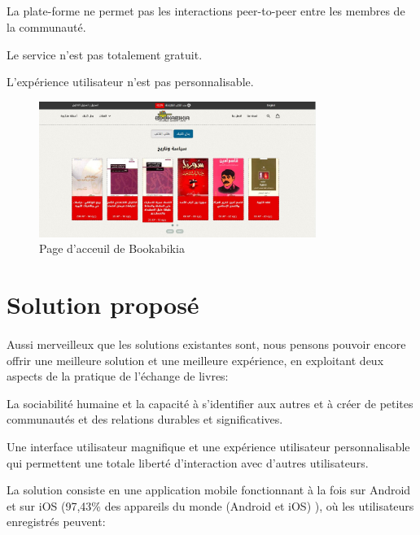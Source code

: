 \subparagraph*{}
\begin{list}{•}{\textbf{Inconvénients}}
	\item La plate-forme ne permet pas les interactions peer-to-peer entre les membres de la communauté.
	\item Le service n'est pas totalement gratuit.
	\item L'expérience utilisateur n'est pas personnalisable.
\end{list}

\begin{figure}[h]
	\begin{center}
		\includegraphics[width=9cm]{Images/chapter1/bookabikiaScreenshot.jpg}
		\caption{{\footnotesize Page d'acceuil de Bookabikia}}
	\end{center}
\end{figure}

\newpage
\section{Solution proposé}
\paragraph*{}
Aussi merveilleux que les solutions existantes sont, nous pensons pouvoir encore offrir une meilleure solution et une meilleure expérience, en exploitant deux aspects de la pratique de l'échange de livres:

\begin{list}{•}{}
	\item La sociabilité humaine et la capacité à s'identifier aux autres et à créer de petites communautés et des relations durables et significatives.
	\item Une interface utilisateur magnifique et une expérience utilisateur personnalisable qui permettent une totale liberté d'interaction avec d'autres utilisateurs.
\end{list}

La solution consiste en une application mobile fonctionnant à la fois sur Android et sur iOS (97,43\% des appareils du monde (Android et iOS) \cite{noauthor_mobile_nodate}), où les utilisateurs enregistrés peuvent:


